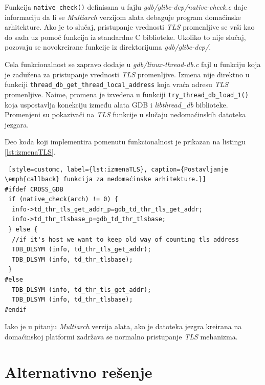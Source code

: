 \documentclass[12pt,oneside]{memoir}
\begin{document}
Funkcija \texttt{native\_check()} definisana u fajlu \emph{gdb/glibc-dep/native-check.c} daje informaciju da li se \emph{Multiarch} verzijom alata debaguje program domaćinske arhitekture. Ako je to slučaj, pristupanje vrednosti \emph{TLS} promenljive se vrši kao do sada uz pomoć funkcija iz standardne C biblioteke. Ukoliko to nije slučaj, pozovaju se novokreirane funkcije iz direktorijuma \emph{gdb/glibc-dep/}.

Cela funkcionalnost se zapravo dodaje u \emph{gdb/linux-thread-db.c} fajl u funkciju koja je zadužena za pristupanje vrednosti \emph{TLS} promenljive. Izmena nije direktno u funkciji \texttt{thread\_db\_get\_thread\_local\_address} koja vraća adresu \emph{TLS} promenljive. Naime, promena je izvedena u funkciji \texttt{try\_thread\_db\_load\_1()} koja uspostavlja konekciju između alata GDB i \emph{libthread\_db} biblioteke. Promenjeni su pokazivači na \emph{TLS} funkcije u slučaju nedomaćinskih datoteka jezgara.

Deo koda koji implementira pomenutu funkcionalnost je prikazan na listingu \ref{lst:izmenaTLS}.
\begin{lstlisting} [style=customc, label={lst:izmenaTLS}, caption={Postavljanje \emph{callback} funkcija za nedomaćinske arhitekture.}]
#ifdef CROSS_GDB
 if (native_check(arch) != 0) {
  info->td_thr_tls_get_addr_p=gdb_td_thr_tls_get_addr;
  info->td_thr_tlsbase_p=gdb_td_thr_tlsbase;
 } else {
  //if it's host we want to keep old way of counting tls address
  TDB_DLSYM (info, td_thr_tls_get_addr);
  TDB_DLSYM (info, td_thr_tlsbase);
 }
#else
  TDB_DLSYM (info, td_thr_tls_get_addr);
  TDB_DLSYM (info, td_thr_tlsbase);
#endif
\end{lstlisting}
Iako je u pitanju \emph{Multiarch} verzija alata, ako je datoteka jezgra kreirana na domaćinskoj platformi zadržava se normalno pristupanje \emph{TLS} mehanizma.

\section{Alternativno rešenje}
\end{document}
